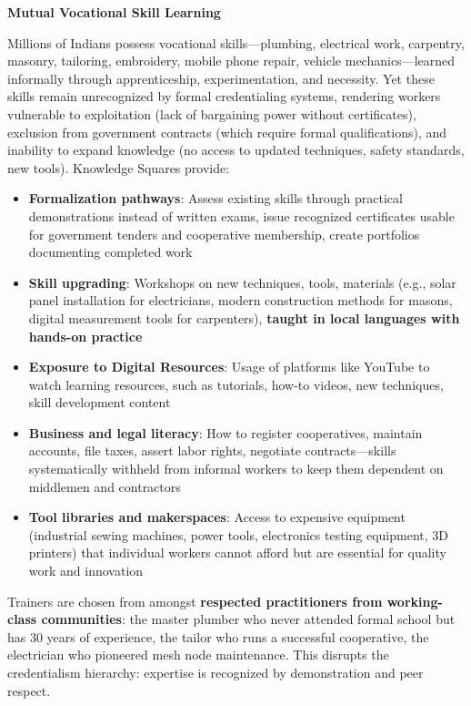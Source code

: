 \textbf{Mutual Vocational Skill Learning}

Millions of Indians possess vocational skills---plumbing, electrical
work, carpentry, masonry, tailoring, embroidery, mobile phone repair,
vehicle mechanics---learned informally through apprenticeship,
experimentation, and necessity. Yet these skills remain unrecognized by
formal credentialing systems, rendering workers vulnerable to
exploitation (lack of bargaining power without certificates), exclusion
from government contracts (which require formal qualifications), and
inability to expand knowledge (no access to updated techniques, safety
standards, new tools). Knowledge Squares provide:

\begin{itemize}
\tightlist
\item
  \textbf{Formalization pathways}: Assess existing skills through
  practical demonstrations instead of written exams, issue recognized
  certificates usable for government tenders and cooperative membership,
  create portfolios documenting completed work
\item
  \textbf{Skill upgrading}: Workshops on new techniques, tools,
  materials (e.g., solar panel installation for electricians, modern
  construction methods for masons, digital measurement tools for
  carpenters), \textbf{taught in local languages with hands-on practice}
\item
  \textbf{Exposure to Digital Resources}: Usage of platforms like
  YouTube to watch learning resources, such as tutorials, how-to videos,
  new techniques, skill development content
\item
  \textbf{Business and legal literacy}: How to register cooperatives,
  maintain accounts, file taxes, assert labor rights, negotiate
  contracts---skills systematically withheld from informal workers to
  keep them dependent on middlemen and contractors
\item
  \textbf{Tool libraries and makerspaces}: Access to expensive equipment
  (industrial sewing machines, power tools, electronics testing
  equipment, 3D printers) that individual workers cannot afford but are
  essential for quality work and innovation
\end{itemize}

Trainers are chosen from amongst \textbf{respected practitioners from
working-class communities}: the master plumber who never attended formal
school but has 30 years of experience, the tailor who runs a successful
cooperative, the electrician who pioneered mesh node maintenance. This
disrupts the credentialism hierarchy: expertise is recognized by
demonstration and peer respect.

